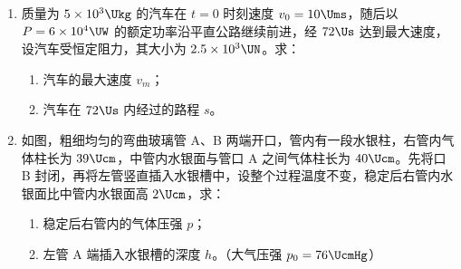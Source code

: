 \documentclass[\gkver]{gaokaozhenti}
\begin{document}
\begin{enumerate}
{（2）当横坐标为 6.05 时，$\varphi_{1} = 0.6$，横坐标为 6.65 时，$\varphi_{2} = 0.05$，由于两种单色光的强度之比 $I_{B1}:I_{B2} = 2:3$，因此 $\varphi_{B} = \frac{2}{5}\times 0.6 + \frac{3}{5}\times 0.05 = 0.27$。由于传感器的输出强度相同，因此 $I_{A}:I_{B} = \varphi_{A}:\varphi_{B} = 27:35$。
}

\item
质量为 $5\times10^{3}\Ukg$ 的汽车在 $t = 0$ 时刻速度 $v_{0} = 10\Ums$，随后以 $P = 6\times10^{4}\UW$ 的额定功率沿平直公路继续前进，经 $72\Us$ 达到最大速度，设汽车受恒定阻力，其大小为 $2.5\times10^{3}\UN$。求：
\begin{enumerate}
	\item
	汽车的最大速度 $v_{m}$；
	\item
	汽车在 $72\Us$ 内经过的路程 $s$。
\end{enumerate}

\item
如图，粗细均匀的弯曲玻璃管 A、B 两端开口，管内有一段水银柱，右管内气体柱长为 $39\Ucm$，中管内水银面与管口 A 之间气体柱长为 $40\Ucm$。先将口 B 封闭，再将左管竖直插入水银槽中，设整个过程温度不变，稳定后右管内水银面比中管内水银面高 $2\Ucm$，求：
\begin{enumerate}
	\item
	稳定后右管内的气体压强 $p$；
	\item
	左管 A 端插入水银槽的深度 $h$。（大气压强 $p_{0} = 76\UcmHg$）
\end{enumerate}
\onepicture[align=right, h=5.03cm]{}
\end{enumerate}
\end{document}
